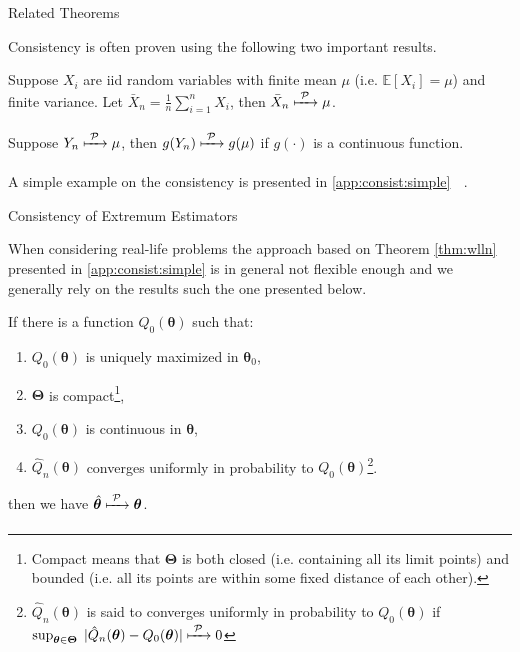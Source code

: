 \documentclass[envcountsect,usenames,dvipsnames]{beamer}
\def\btheta{\bm \theta}
\def\bTheta{\bm \Theta}
\theoremstyle{mystyle}
\begin{document}
\begin{frame}{Related Theorems}

Consistency is often proven using the following two important results.

	\begin{Theorem}
	\label{thm:wlln}
		Suppose $X_i$ are iid random variables with finite mean $\mu$ (i.e. $\mathbb{E}[X_i] = \mu$) and finite variance. Let $\bar{X}_n = \frac{1}{n} \sum_{i = 1}^n X_i$, then $\bar{X}_n \xmapsto[\;\;\;\;\; ]{\mathcal{P}} \mu$.
		\label{theo.wll}
	\end{Theorem}
	
	\begin{Theorem}
	\label{thm:continuousmap}
		Suppose $Y_n \xmapsto[\;\;\;\;\; ]{\mathcal{P}} \mu$, then $g(Y_n) \xmapsto[\;\;\;\;\; ]{\mathcal{P}} g(\mu)$ if $g(\cdot)$ is a continuous function.
	\end{Theorem}
	
\vspace{0.5cm} 
A simple example on the consistency is presented in \ref{app:consist:simple} $\;$ \hyperlink{app:consist:simple}{}.  
\end{frame}


\begin{frame}{Consistency of Extremum Estimators}
	\footnotesize
	
	When considering real-life problems the approach based on Theorem \ref{thm:wlln} presented in \ref{app:consist:simple} is in general not flexible enough and we generally rely on the results such the one presented below.
	
	\begin{Theorem}
	\label{thm:consist}
		\footnotesize
			If there is a function ${Q}_0 (\btheta)$ such that:
			\begin{enumerate}
				\setlength{\itemindent}{0.06in}
				\item[(C.1)] ${Q}_0 (\btheta)$ is uniquely maximized in $\btheta_0$,
				\label{theo:consist:cond:unique:max}
				\item[(C.2)] $\bTheta$ is compact\footnote{Compact means that $\bTheta$ is both closed (i.e. containing all its limit points) and bounded (i.e. all its points are within some fixed distance of each other).},
				\label{theo:consist:cond:compact}
				\item[(C.3)] ${Q}_0 (\btheta)$ is continuous in $\btheta$,
				\label{theo:consist:cond:continuous}
				\item[(C.4)] $\hat{Q}_n (\btheta)$ converges uniformly in probability to $Q_0 (\btheta)$\footnote{$\hat{Q}_n (\btheta)$ is said to converges uniformly in probability to $Q_0 (\btheta)$ if $\sup_{\btheta \in \bTheta} \; |\hat{Q}_n (\btheta) - {Q}_0 (\btheta)| \xmapsto[\;\;\;\;\; ]{\mathcal{P}} 0$}.
				\label{theo:consist:cond:converge}
			\end{enumerate}
			then we have $\hat{\btheta} \xmapsto[\;\;\;\;\; ]{\mathcal{P}} \btheta$.
	\end{Theorem}
\end{frame}
\end{document}
